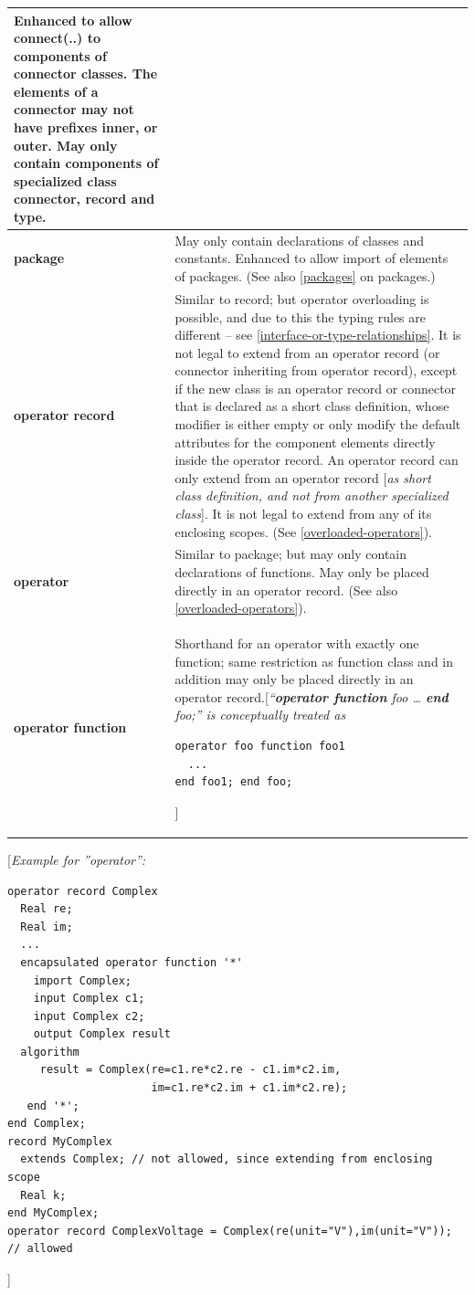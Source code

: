 \documentclass[10pt,a4paper]{report}
\begin{document}
\begin{longtable}{|p{4cm}|p{9cm}|}
Enhanced to allow connect(..) to components of connector classes. The
elements of a connector may not have prefixes inner, or outer. May only
contain components of specialized class connector, record and
type.\\ \hline
\textbf{package} & May only contain declarations of classes and
constants. Enhanced to allow import of elements of packages. (See also
\ref{packages} on packages.)\\ \hline
\textbf{operator record} & Similar to record; but operator overloading
is possible, and due to this the typing rules are different -- see
\ref{interface-or-type-relationships}. It is not legal to extend from an operator record (or
connector inheriting from operator record), except if the new class is
an operator record or connector that is declared as a short class
definition, whose modifier is either empty or only modify the default
attributes for the component elements directly inside the operator
record. An operator record can only extend from an operator record
{[}\emph{as short class definition, and not from another specialized
class}{]}. It is not legal to extend from any of its enclosing scopes.
(See \ref{overloaded-operators}).\\ \hline
\textbf{operator} & Similar to package; but may only contain
declarations of functions. May only be placed directly in an operator
record. (See also \ref{overloaded-operators}).\\ \hline
\textbf{operator function} & Shorthand for an
operator with exactly one function; same restriction as function class
and in addition may only be placed directly in an operator
record.{[}\emph{``\textbf{operator function} foo \ldots{}
\textbf{end} foo;'' is conceptually treated as}
\begin{lstlisting}[language=modelica]
operator foo function foo1
  ...
end foo1; end foo;
\end{lstlisting}
{]}\\ \hline
\end{longtable}

{[}\emph{Example for ''operator'': }
\begin{lstlisting}[language=modelica]
operator record Complex
  Real re;
  Real im;
  ...
  encapsulated operator function '*'
    import Complex;
    input Complex c1;
    input Complex c2;
    output Complex result
  algorithm
     result = Complex(re=c1.re*c2.re - c1.im*c2.im,
                      im=c1.re*c2.im + c1.im*c2.re);
   end '*';
end Complex;
record MyComplex
  extends Complex; // not allowed, since extending from enclosing scope
  Real k;
end MyComplex;
operator record ComplexVoltage = Complex(re(unit="V"),im(unit="V")); // allowed
\end{lstlisting}
{]}
\end{document}
